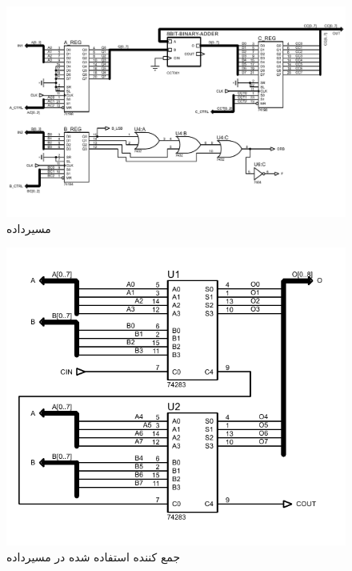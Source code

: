 \documentclass{article}
\begin{document}
\begin{figure}
	\centering
	\includegraphics[scale=0.7]{./graphics/DP}
	\caption{مسیرداده}
\end{figure}


\begin{figure}
	\centering
	\includegraphics[scale=0.7]{./graphics/adder}
	\caption{جمع کننده استفاده شده در مسیرداده}
\end{figure}
\end{document}
